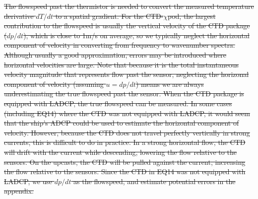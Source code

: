 \documentclass{ametsoc}
\providecommand{\DIFdel}[1]{{\protect\color{red}\sout{#1}}}                      %
\providecommand{\DIFdelbegin}{} %
\providecommand{\DIFdelend}{} %
\begin{document}
\DIFdelbegin \DIFdel{The flowspeed past the thermistor is needed to convert the measured temperature derivative $dT/dt$ to a spatial gradient. For the CTD-$\chi$pod, the largest contribution to the flowspeed is usually the vertical velocity of the CTD package ($dp/dt$), which is close to 1m/s on average, so we typically neglect the horizontal component of velocity in converting from frequency to wavenumber spectra. Although usually a good approximation, errors may be introduced where horizontal velocities are large. Note that because it is the total instantaneous velocity magnitude that represents flow past the sensor, neglecting the horizonal component of velocity (assuming $u=dp/dt$) means we are always underestimating the true flowspeed past the sensor. When the CTD package is equipped with LADCP, the true flowspeed can be measured. In some cases (including EQ14) where the CTD was not equipped with LADCP, it would seem that the ship's ADCP could be used to estimate the horizontal component of velocity. However, because the CTD does not travel perfectly vertically in strong currents, this is difficult to do in practice. In a strong horizontal flow, the CTD will drift with the current while descending, lowering the flow relative to the sensors. On the upcasts, the CTD will be pulled against the current, increasing the flow relative to the sensors. Since the CTD in EQ14 was not equipped with LADCP, we use $dp/dt$ as the flowspeed, and estimate potential errors in the appendix.
}\DIFdelend %
\end{document}
